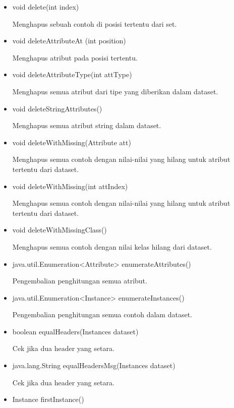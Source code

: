 \begin{itemize}
	\item void delete(int index)
	
	Menghapus sebuah contoh di posisi tertentu dari set.
	
	\item void deleteAttributeAt (int position)
	
	Menghapus atribut pada posisi tertentu. %
	
	\item void deleteAttributeType(int attType)
	
	Menghapus semua atribut dari tipe yang diberikan dalam dataset.
	
	\item void deleteStringAttributes()
	
	Menghapus semua atribut string dalam dataset.
	
	\item void deleteWithMissing(Attribute att)
	
	Menghapus semua contoh dengan nilai-nilai yang hilang untuk atribut tertentu dari dataset.
	
	\item void deleteWithMissing(int attIndex)
	
	Menghapus semua contoh dengan nilai-nilai yang hilang untuk atribut tertentu dari dataset.
	
	\item void deleteWithMissingClass()
	
	Menghapus semua contoh dengan nilai kelas hilang dari dataset.
	
	\item java.util.Enumeration<Attribute> enumerateAttributes()
	
	Pengembalian penghitungan semua atribut.
	
	\item java.util.Enumeration<Instance> enumerateInstances()
	
	Pengembalian penghitungan semua contoh dalam dataset.
	
	\item boolean equalHeaders(Instances dataset)
	
	Cek jika dua header yang setara.
	
	\item java.lang.String equalHeadersMsg(Instances dataset)
	
	Cek jika dua header yang setara.
	
	\item Instance firstInstance()
	

\end{itemize}
